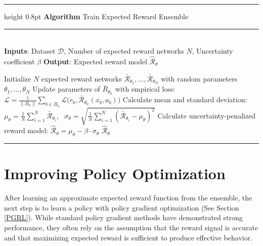 \documentclass[./dissertation.tex]{subfiles}
\begin{document}
\noindent\begin{minipage}{\textwidth}
\singlespacing
{}
\hrule height 0.8pt
\vspace{2pt}
\tagmcend{}
\noindent\textbf{Algorithm \thealgorithm} Train Expected Reward Ensemble \\[-9pt]
\rule{\textwidth}{0.4pt}\\[-4pt]
\label{Reward Ensemble}
\noindent\textbf{Inputs}: Dataset $\mathcal{D}$, Number of expected reward networks $N$, Uncertainty coefficient $\beta$
\newline
\noindent\textbf{Output}: Expected reward model $\hat{\mathcal{R}}_\theta$
\begin{algorithmic}[1]
\State Initialize $N$ expected reward networks $\bar{\mathcal{R}}_{\theta_1}, ..., \bar{\mathcal{R}}_{\theta_N}$ with random parameters $\theta_1,..., \theta_N$
            \State Update parameters of $\bar{R}_{\theta_n}$ with empirical loss: $\mathscr{L} = \frac{1}{\|B_n\|} \sum_{b \in B_n}\mathcal{L}\big(r_b,\bar{\mathcal{R}}_{\theta_n}(x_b,a_b)\big)$
        \EndFor
    \EndFor
\State Calculate mean and standard deviation: $\mu_\theta = \frac{1}{N} \sum_{i=1}^N \bar{\mathcal{R}}_{\theta_i}$, \ $\sigma_\theta = \sqrt {\frac{1}{N} \sum_{i=1}^N ( \bar{\mathcal{R}}_{\theta_i} - \mu_\theta ) ^2}$
\State Calculate uncertainty-penalized reward model: $\hat{\mathcal{R}}_{\theta} = \mu_\theta - \beta \cdot \sigma_\theta$ 
\State \Return $\hat{\mathcal{R}}_{\theta}$
\end{algorithmic}
\vspace{2pt}
\hrule
\tagmcend{}
\end{minipage}

\section {Improving Policy Optimization}
\label{Policy Optimization}
After learning an approximate expected reward function from the ensemble, the next step is to learn a policy with policy gradient optimization (See Section \ref{PGRL}). While standard policy gradient methods have demonstrated strong performance, they often rely on the assumption that the reward signal is accurate and that maximizing expected reward is sufficient to produce effective behavior.
\end{document}
